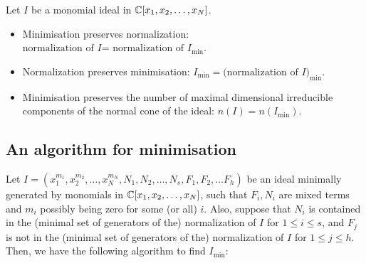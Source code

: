\documentclass[11pt,a4paper,leqno,noamsfonts]{amsart}
\numberwithin{equation}{section}
\begin{document}
\begin{prop}\label{nImin}Let  $I$ be a monomial ideal in ${\mathbb{C}}[x_1,x_2,\ldots,x_N]$.\begin{itemize}
\item  Minimisation preserves normalization: 
$ \text{normalization of $I$= normalization of $I_{\min}$}$.
   

    \item  Normalization preserves minimisation: $\text{$I_{\min}=($normalization of $I)_{\min}$}$.


\item Minimisation preserves the number of maximal dimensional irreducible components of the normal cone of the ideal: $n(I)=n(I_{\min})$.
\end{itemize}
   
\end{prop}




\subsection{An algorithm for minimisation} \label{minalgorithm}

Let $I=(x_{1}^{m_1},x_{2}^{m_2},\ldots,x_{N}^{m_N},N_1,N_2,\ldots,N_s,F_1,F_2,\ldots F_{h})$ be an ideal minimally generated by monomials in ${\mathbb{C}}[x_1,x_2,\ldots,x_N]$, such that $F_i,N_i$ are mixed terms and $m_i$ possibly being zero for some (or all) $i$. Also, suppose that $N_i$ is contained in the (minimal set of generators of the) normalization of $I$ for $1\leq i\leq s$, and $F_j$ is not in the (minimal set of generators of the) normalization of $I$ for $1\leq j\leq h$. Then, we have the following algorithm to find $I_{\min}$:
\end{document}
